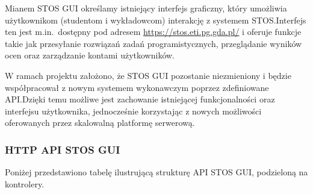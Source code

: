 \documentclass[12pt,a4paper]{article}
\begin{document}
Mianem STOS GUI określamy
istniejący interfejs graficzny, który umożliwia użytkownikom (studentom i wykładowcom) interakcję z systemem STOS.\@ Interfejs ten jest m.in.\ dostępny pod adresem \url{https://stos.eti.pg.gda.pl/} i oferuje funkcje takie jak przesyłanie rozwiązań zadań programistycznych, przeglądanie wyników ocen oraz zarządzanie kontami użytkowników.

W ramach projektu założono, że STOS GUI pozostanie niezmieniony i będzie współpracował z nowym systemem wykonawczym poprzez zdefiniowane API.\@ Dzięki temu możliwe jest zachowanie istniejącej funkcjonalności oraz interfejsu użytkownika, jednocześnie korzystając z nowych możliwości oferowanych przez skalowalną platformę serwerową.

\subsubsection{HTTP API STOS GUI}
Poniżej przedstawiono tabelę ilustrującą strukturę API STOS GUI, podzieloną na kontrolery.
\end{document}
